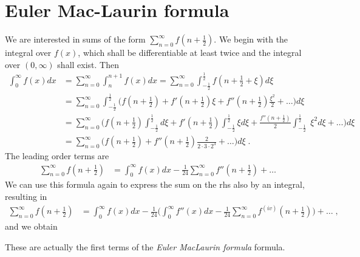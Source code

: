 \section{Euler Mac-Laurin formula}\label{app:Euler:MacLaurin}
We are interested in sums of the form
$\sum_{n=0}^{\infty} f(n+\tfrac{1}{2})$.
We begin with the integral over $f(x)$, which shall be differentiable at least twice and the integral over $(0,\infty)$ shall exist. Then
%
%
\begin{align*}
\int_{0}^{\infty} f(x) dx
&=\sum_{n=0}^{\infty}\int_{n}^{n+1}  f(x)dx
=\sum_{n=0}^{\infty}\int_{-\tfrac{1}{2}}^{\tfrac{1}{2}}
  f(n+\tfrac{1}{2} + \xi)d\xi\\
&=
  \sum_{n=0}^{\infty}\int_{-\tfrac{1}{2}}^{\tfrac{1}{2}}
  \bigg(f(n+\tfrac{1}{2}) + f'(n+\tfrac{1}{2}) \xi
  +f''(n+\tfrac{1}{2}) \frac{\xi^{2}}{2} +\ldots \bigg)d\xi\\
  &=
  \sum_{n=0}^{\infty}
  \bigg(f(n+\tfrac{1}{2})\int_{-\tfrac{1}{2}}^{\tfrac{1}{2}} d\xi + f'(n+\tfrac{1}{2}) 
  \int_{-\tfrac{1}{2}}^{\tfrac{1}{2}} 
  \xi d\xi
  +\frac{f''(n+\tfrac{1}{2})}{2} \int_{-\tfrac{1}{2}}^{\tfrac{1}{2}}\;\xi^{2} d\xi+\ldots \bigg)d\xi\\
&=
  \sum_{n=0}^{\infty}
  \bigg(f(n+\tfrac{1}{2}) 
  +f''(n+\tfrac{1}{2})\frac{2}{2\cdot 3 \cdot 2^{3}}+\ldots \bigg)d\xi\;.
\end{align*}
The leading order terms are
%
\begin{align*}
\sum_{n=0}^{\infty} f(n+\tfrac{1}{2}) &= \int_{0}^{\infty}
f(x) dx - \frac{1}{24} \sum_{n=0}^{\infty} f''(n+\tfrac{1}{2})+\ldots
\end{align*}
%
We can use this formula again to express the sum on the rhs also by an integral, resulting in 
\begin{align*}
\sum_{n=0}^{\infty} f(n+\tfrac{1}{2}) &= 
\int_{0}^{\infty}f(x) dx 
- \frac{1}{24} \bigg(\int_{0}^{\infty}f''(x) dx  -\frac{1}{24} \sum_{n=0}^{\infty} f^{(iv)}(n+\tfrac{1}{2})\bigg)+\ldots\;,
\end{align*}
%
and we obtain 

%
%
These are actually the first terms of the {\em Euler MacLaurin formula} formula.



